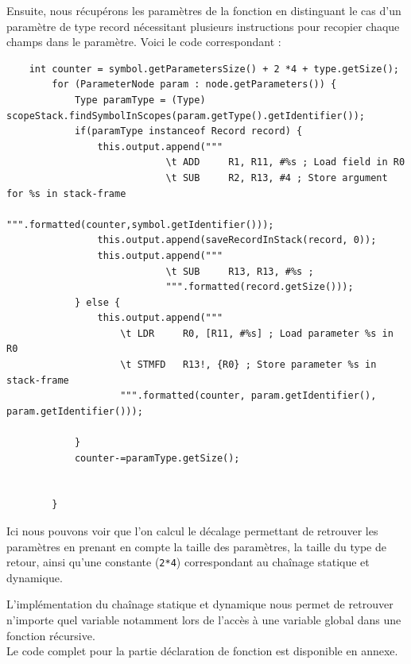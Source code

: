 \documentclass[french,a4paper]{article}
\begin{document}
    Ensuite, nous récupérons les paramètres de la fonction en distinguant le cas d'un paramètre de type record nécessitant plusieurs instructions pour recopier chaque champs dans le paramètre. Voici le code correspondant :
    \begin{lstlisting}
    int counter = symbol.getParametersSize() + 2 *4 + type.getSize();
        for (ParameterNode param : node.getParameters()) {
            Type paramType = (Type) scopeStack.findSymbolInScopes(param.getType().getIdentifier());
            if(paramType instanceof Record record) {
                this.output.append("""
                            \t ADD     R1, R11, #%s ; Load field in R0
                            \t SUB     R2, R13, #4 ; Store argument for %s in stack-frame
                            """.formatted(counter,symbol.getIdentifier()));
                this.output.append(saveRecordInStack(record, 0));
                this.output.append("""
                            \t SUB     R13, R13, #%s ;
                            """.formatted(record.getSize()));
            } else {
                this.output.append("""
                    \t LDR     R0, [R11, #%s] ; Load parameter %s in R0
                    \t STMFD   R13!, {R0} ; Store parameter %s in stack-frame
                    """.formatted(counter, param.getIdentifier(), param.getIdentifier()));

            }
            counter-=paramType.getSize();


        }
    \end{lstlisting}

    Ici nous pouvons voir que l'on calcul le décalage permettant de retrouver les paramètres en prenant en compte la taille des paramètres, la taille du type de retour, ainsi qu'une constante (\texttt{2*4}) correspondant au chaînage statique et dynamique.

    L'implémentation du chaînage statique et dynamique nous permet de retrouver n'importe quel variable notamment lors de l'accès à une variable global dans une fonction récursive. \\

    Le code complet pour la partie déclaration de fonction est disponible en annexe.
\end{document}
